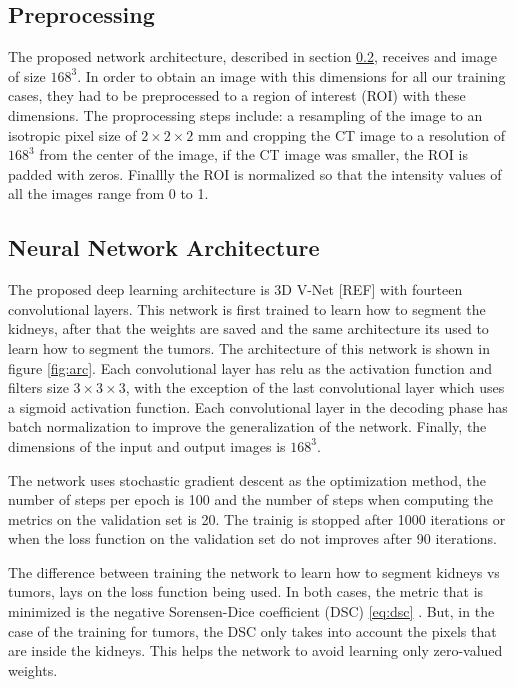 \documentclass{article}
\begin{document}
\subsection{Preprocessing}
\label{sec:prepro}
The proposed network architecture, described in section \ref{sec:nnarc}, receives and image of size $168^3$. In order to
obtain an image with this dimensions for all our training cases, they had to be preprocessed to a region of interest (ROI) with
these dimensions.  The proprocessing steps include: a resampling of the image to an isotropic pixel size of $2 \times 2 \times 2$ mm and cropping the CT image to a resolution of $168^3$ from the center of the image, if the CT image was smaller, the ROI is padded
with zeros. Finallly the ROI is normalized so that the intensity values of all the images range from 0 to 1. 

\subsection{Neural Network Architecture}
\label{sec:nnarc}
The proposed deep learning architecture is 3D V-Net [REF] with fourteen convolutional layers. This network is
first trained to learn how to segment the kidneys, after that the weights are saved and 
the same architecture its used to learn how to segment the tumors. The architecture of this 
network is shown in figure \ref{fig:arc}.  Each convolutional layer has relu as the activation function and
filters size $3\times 3 \times 3$, with the exception of the last convolutional layer which 
uses a sigmoid activation function. Each convolutional layer in the decoding phase has batch normalization to improve the generalization of the network. Finally, the dimensions of the input and output images is $168^3$. 

The network uses stochastic gradient descent as the optimization method, the number of steps per epoch is
100 and the number of steps when computing the metrics on the validation set is 20. The trainig is
stopped after 1000 iterations or when the loss function on the validation set do not improves after
90 iterations. 

The difference between training the network to learn how to segment kidneys vs tumors, lays on the 
loss function being used. In both cases, the metric that is minimized is the negative Sorensen-Dice coefficient (DSC) \ref{eq:dsc}
\cite{dice1945measures}.  But, in the case of the training for tumors, the DSC only takes into account the pixels that are
inside the kidneys. This helps the network to avoid learning only zero-valued weights. 
\end{document}
